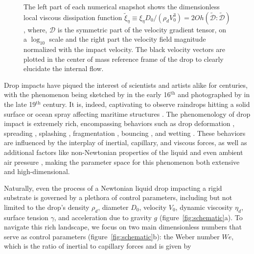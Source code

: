 \documentclass{jfm}
\newcommand{\bb}{\color{black} \normalfont}
\begin{document}
\begin{figure}
{{		The left part of each numerical snapshot shows the dimensionless local viscous dissipation function $\tilde{\xi}_\eta \equiv \xi_\eta D_0/\left(\rho_dV_0^3\right) = 2Oh\left(\boldsymbol{\tilde{\mathcal{D}}:\tilde{\mathcal{D}}}\right)$, where, $\boldsymbol{\mathcal{D}}$ is the symmetric part of the velocity gradient tensor, on a $\log_{10}$ scale and the right part the velocity field magnitude normalized with the impact velocity. The black velocity vectors are plotted in the center of mass reference frame of the drop to clearly elucidate the internal flow. \bb}}
\label{fig:summary}
\end{figure}

Drop impacts have piqued the interest of scientists and artists alike for centuries, with the phenomenon being sketched by \citet{da1508notebooks} in the early 16$^{\text{th}}$ and photographed by \citet{worthington1876, worthington1876b} in the late 19$^{\text{th}}$ century. It is, indeed, captivating to observe raindrops hitting a solid surface \citep{kim2020raindrop, lohse-2020-pnas} or ocean spray affecting maritime structures \citep{berny2021statistics, villermaux2022bubbles}. The phenomenology of drop impact is extremely rich, encompassing behaviors such as drop deformation \citep{Biance2006, molavcek2012quasi, chevy2012liquid}, spreading \citep{laan2014maximum, Wildeman2016}, splashing \cite{xu2005drop, riboux2014experiments, thoraval2021nanoscopic}, fragmentation \citep{villermaux2011drop, villermaux2020fragmentation}, bouncing \citep{Richard2000, kolinski-2014-epl, Jha2020, chubynsky-2020-prl, sharma-2021-jfm, sanjay_chantelot_lohse_2023}, and wetting \citep{degennes-1985-rmp, fukai-1995-pof, quere-2008-arms, Bonn2009}. These behaviors are influenced by the interplay of inertial, capillary, and viscous forces, as well as additional factors like non-Newtonian properties \citep{bartolo2005retraction, bartolo2007dynamics,  smith-2010-prl, gorin-2022-langmuir} of the liquid and even ambient air pressure \citep{xu2005drop}, making the parameter space for this phenomenon both extensive and high-dimensional. 

Naturally, even the process of a Newtonian liquid drop impacting a rigid substrate is governed by a plethora of control parameters, including but not limited to the drop's density $\rho_d$, diameter $D_0$, velocity $V_0$, dynamic viscosity $\eta_d$, surface tension $\gamma$, and acceleration due to gravity $g$ (figure~\ref{fig:schematic}a). 
To navigate this rich landscape, we focus on two main dimensionless numbers that serve as control parameters (figure~\ref{fig:schematic}b): the Weber number $We$, which is the ratio of inertial to capillary forces and is given by
\end{document}
